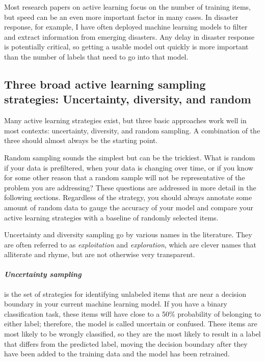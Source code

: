 \documentclass[sigconf,nonacm,screen,pbalance]{acmart}
\begin{document}
Most research papers on active learning focus on the number of training items, but speed can be an even more important factor in many cases. In disaster response, for example, I have often deployed machine learning models to filter and extract information from emerging disasters. Any delay in disaster response is potentially critical, so getting a usable model out quickly is more important than the number of labels that need to go into that model.

\subsection{Three broad active learning sampling strategies: Uncertainty, diversity, and random}
Many active learning strategies exist, but three basic approaches work well in most contexts: uncertainty, diversity, and random sampling. A combination of the three should almost always be the starting point.

Random sampling sounds the simplest but can be the trickiest. What is random if your data is prefiltered, when your data is changing over time, or if you know for some other reason that a random sample will not be representative of the problem you are addressing? These questions are addressed in more detail in the following sections. Regardless of the strategy, you should always annotate some amount of random data to gauge the accuracy of your model and compare your active learning strategies with a baseline of randomly selected items.

Uncertainty and diversity sampling go by various names in the literature. They are often referred to as \emph{exploitation} and \emph{exploration}, which are clever names that alliterate and rhyme, but are not otherwise very transparent.

\paragraph{\bf\em Uncertainty sampling}
is the set of strategies for identifying unlabeled items that are near a decision boundary in your current machine learning model. If you have a binary classification task, these items will have close to a 50\% probability of belonging to either label; therefore, the model is called uncertain or confused. These items are most likely to be wrongly classified, so they are the most likely to result in a label that differs from the predicted label, moving the decision boundary after they have been added to the training data and the model has been retrained.
\end{document}
